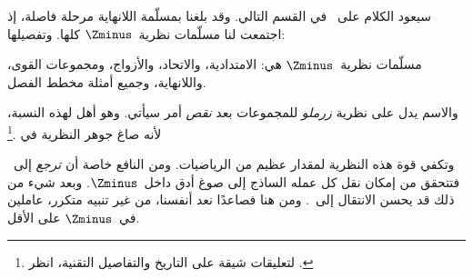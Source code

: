 \documentclass[../../../include/open-logic-section]{subfiles}
\begin{document}

سيعود الكلام على~\stagesinf{} في القسم التالي. وقد بلغنا بمسلّمة
اللانهاية مرحلة فاصلة، إذ اجتمعت لنا مسلّمات نظرية~$\Zminus$ كلها.
وتفصيلها:

\begin{defn}
مسلّمات نظرية~$\Zminus$ هي: الامتدادية، والاتحاد، والأزواج،
ومجموعات القوى، واللانهاية، وجميع أمثلة مخطط الفصل.
\end{defn}

والاسم يدل على نظرية \emph{زرملو} للمجموعات بعد \emph{نقص} أمر سيأتي.
وهو أهل لهذه النسبة، لأنه صاغ جوهر النظرية في
\citeyear{Zermelo1908Untersuchungen}.\footnote{لتعليقات شيقة على
  التاريخ والتفاصيل التقنية، انظر
  \citet[Appendix A]{Potter2004}.}

وتكفي قوة هذه النظرية لمقدار عظيم من الرياضيات. ومن النافع خاصة أن
\emph{ترجع} إلى~ فتتحقق من إمكان نقل كل عمله
الساذج إلى صوغ أدق داخل~$\Zminus$. وبعد شيء من ذلك قد يحسن الانتقال
إلى~. ومن هنا فصاعدًا نعد أنفسنا،
من غير تنبيه متكرر، عاملين في~$\Zminus$ على الأقل.
\end{document}
